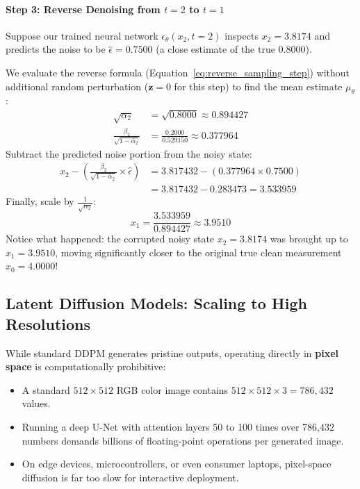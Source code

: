 \begin{example}
\paragraph{Step 3: Reverse Denoising from $t = 2$ to $t = 1$}
Suppose our trained neural network $\epsilon_\theta(x_2, t=2)$ inspects $x_2 = 3.8174$ and predicts the noise to be $\hat{\epsilon} = 0.7500$ (a close estimate of the true $0.8000$).

We evaluate the reverse formula (Equation~\eqref{eq:reverse_sampling_step}) without additional random perturbation ($\mathbf{z} = 0$ for this step) to find the mean estimate $\mu_\theta$:
\begin{align*}
\sqrt{\alpha_2} &= \sqrt{0.8000} \approx 0.894427\\
\frac{\beta_2}{\sqrt{1 - \bar{\alpha}_2}} &= \frac{0.2000}{0.529150} \approx 0.377964
\end{align*}
Subtract the predicted noise portion from the noisy state:
\begin{align*}
x_2 - \left(\frac{\beta_2}{\sqrt{1 - \bar{\alpha}_2}} \times \hat{\epsilon}\right) &= 3.817432 - (0.377964 \times 0.7500)\\
&= 3.817432 - 0.283473 = 3.533959
\end{align*}
Finally, scale by $\frac{1}{\sqrt{\alpha_2}}$:
\begin{equation*}
x_1 = \frac{3.533959}{0.894427} \approx 3.9510
\end{equation*}
Notice what happened: the corrupted noisy state $x_2 = 3.8174$ was brought up to $x_1 = 3.9510$, moving significantly closer to the original true clean measurement $x_0 = 4.0000$!
\end{example}

\subsection{Latent Diffusion Models: Scaling to High Resolutions}\label{subsec:latent_diffusion}

While standard DDPM generates pristine outputs, operating directly in \textbf{pixel space} is computationally prohibitive:
\begin{itemize}
    \item A standard $512 \times 512$ RGB color image contains $512 \times 512 \times 3 = 786{,}432$ values.
    \item Running a deep U-Net with attention layers 50 to 100 times over 786,432 numbers demands billions of floating-point operations per generated image.
    \item On edge devices, microcontrollers, or even consumer laptops, pixel-space diffusion is far too slow for interactive deployment.
\end{itemize}

